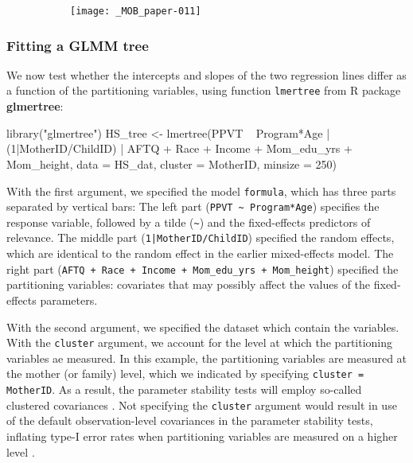 \documentclass[doc,floatsintext,natbib]{apa7}
\begin{document}
\begin{figure}%
\caption{}
\begin{subfigure}{.7\textwidth}
\texttt{[image: \_MOB\_paper-011]}
\end{subfigure}
\label{fig:global_lmm}
\end{figure}%

\FloatBarrier
\subsubsection{Fitting a GLMM tree}

We now test whether the intercepts and slopes of the two regression lines differ as a function of the partitioning variables, using function \verb|lmertree| from R package \textbf{glmertree}:

\begin{Schunk}
\begin{Sinput}
 library("glmertree")
 HS_tree <- lmertree(PPVT ~ Program*Age | (1|MotherID/ChildID) | AFTQ + Race + 
                       Income + Mom_edu_yrs + Mom_height, 
                     data = HS_dat, cluster = MotherID, minsize = 250)
\end{Sinput}
\end{Schunk}

With the first argument, we specified the model \verb|formula|, which has three parts separated by vertical bars: The left part (\verb|PPVT ~ Program*Age|) specifies the response variable, followed by a tilde (\verb|~|) and the fixed-effects predictors of relevance. The middle part (\texttt{1|MotherID/ChildID}) specified the random effects, which are identical to the random effect in the earlier mixed-effects model. The right part (\verb|AFTQ + Race + Income + Mom_edu_yrs + Mom_height|) specified the partitioning variables: covariates that may possibly affect the values of the fixed-effects parameters. 

With the second argument, we specified the dataset which contain the variables. With the \texttt{cluster} argument, we account for the level at which the partitioning variables ae measured. In this example, the partitioning variables are measured at the mother (or family) level, which we indicated by specifying \texttt{cluster = MotherID}. As a result, the parameter stability tests will employ so-called clustered covariances \citep{ZeilyKoll20}. Not specifying the \texttt{cluster} argument would result in use of the default observation-level covariances in the parameter stability tests, inflating type-I error rates when partitioning variables are measured on a higher level \citep{FokkyZeil24}. 
 
\end{document}
